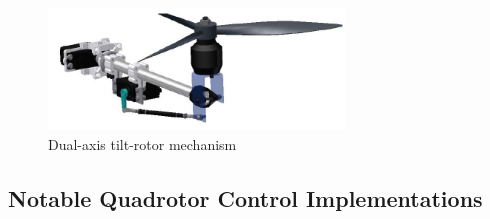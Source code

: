 \begin{figure}
\centering
\includegraphics[width=0.7\textwidth]{figs/gasco-mech}
\caption{Dual-axis tilt-rotor mechanism}
\label{fig:tiltrotor-gasco}
\end{figure}
\subsection{Notable Quadrotor Control Implementations}
\label{subsec:intro.lit.control}
